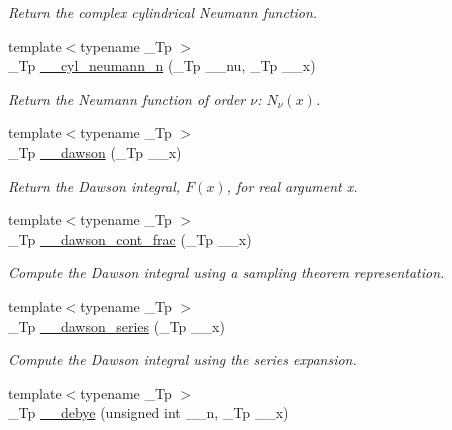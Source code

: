 \begin{DoxyCompactItemize}
\begin{DoxyCompactList}\small\item\em Return the complex cylindrical Neumann function. \end{DoxyCompactList}\item 
{\footnotesize template$<$typename \+\_\+\+Tp $>$ }\\\+\_\+\+Tp \hyperlink{namespacestd_1_1____detail_ae414a6b5c064dc2b9b9a3b28e6cec813}{\+\_\+\+\_\+cyl\+\_\+neumann\+\_\+n} (\+\_\+\+Tp \+\_\+\+\_\+nu, \+\_\+\+Tp \+\_\+\+\_\+x)
\begin{DoxyCompactList}\small\item\em Return the Neumann function of order $ \nu $\+: $ N_{\nu}(x) $. \end{DoxyCompactList}\item 
{\footnotesize template$<$typename \+\_\+\+Tp $>$ }\\\+\_\+\+Tp \hyperlink{namespacestd_1_1____detail_a6384fb4c5af31b41a38c120869a548c7}{\+\_\+\+\_\+dawson} (\+\_\+\+Tp \+\_\+\+\_\+x)
\begin{DoxyCompactList}\small\item\em Return the Dawson integral, $ F(x) $, for real argument {\ttfamily x}. \end{DoxyCompactList}\item 
{\footnotesize template$<$typename \+\_\+\+Tp $>$ }\\\+\_\+\+Tp \hyperlink{namespacestd_1_1____detail_a3ad3b7b4dcebdf69778dbf7a5ba2427c}{\+\_\+\+\_\+dawson\+\_\+cont\+\_\+frac} (\+\_\+\+Tp \+\_\+\+\_\+x)
\begin{DoxyCompactList}\small\item\em Compute the Dawson integral using a sampling theorem representation. \end{DoxyCompactList}\item 
{\footnotesize template$<$typename \+\_\+\+Tp $>$ }\\\+\_\+\+Tp \hyperlink{namespacestd_1_1____detail_a033d91cc1c67280385ff3d1d809a21d1}{\+\_\+\+\_\+dawson\+\_\+series} (\+\_\+\+Tp \+\_\+\+\_\+x)
\begin{DoxyCompactList}\small\item\em Compute the Dawson integral using the series expansion. \end{DoxyCompactList}\item 
{\footnotesize template$<$typename \+\_\+\+Tp $>$ }\\\+\_\+\+Tp \hyperlink{namespacestd_1_1____detail_a26d3f285cfbcaba6fa30d3e4164c6187}{\+\_\+\+\_\+debye} (unsigned int \+\_\+\+\_\+n, \+\_\+\+Tp \+\_\+\+\_\+x)

\end{DoxyCompactItemize}
